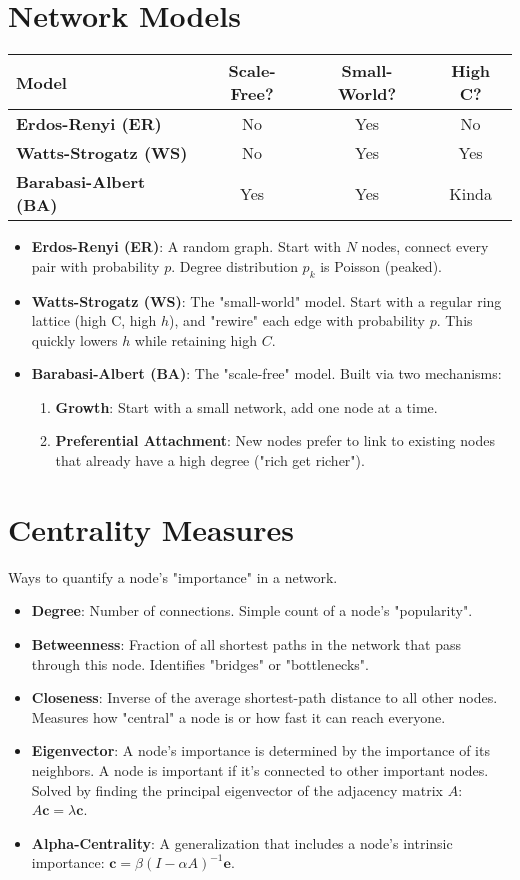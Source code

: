 \documentclass[8pt,a4paper,twocolumn]{article}
\newcommand{\cc}{\mathbf{c}}
\newcommand{\ee}{\mathbf{e}}
\newcommand{\0}{\mathbf{0}}
\begin{document}
\section*{Network Models}
\begin{tabular}{@{}lccc@{}}
\toprule
\textbf{Model} & \textbf{Scale-Free?} & \textbf{Small-World?} & \textbf{High C?} \\
\midrule
\textbf{Erdos-Renyi (ER)} & No & Yes & No \\
\textbf{Watts-Strogatz (WS)} & No & Yes & Yes \\
\textbf{Barabasi-Albert (BA)} & Yes & Yes & Kinda \\
\bottomrule
\end{tabular}
\begin{itemize}
    \item \textbf{Erdos-Renyi (ER)}: A random graph. Start with $N$ nodes, connect every pair with probability $p$. Degree distribution $p_k$ is Poisson (peaked).
    \item \textbf{Watts-Strogatz (WS)}: The "small-world" model. Start with a regular ring lattice (high C, high $h$), and "rewire" each edge with probability $p$. This quickly lowers $h$ while retaining high $C$.
    \item \textbf{Barabasi-Albert (BA)}: The "scale-free" model. Built via two mechanisms:
        \begin{enumerate}
            \item \textbf{Growth}: Start with a small network, add one node at a time.
            \item \textbf{Preferential Attachment}: New nodes prefer to link to existing nodes that already have a high degree ("rich get richer").
        \end{enumerate}
\end{itemize}

\section*{Centrality Measures}
Ways to quantify a node's "importance" in a network.
\begin{itemize}
    \item \textbf{Degree}: Number of connections. Simple count of a node's "popularity".
    \item \textbf{Betweenness}: Fraction of all shortest paths in the network that pass through this node. Identifies "bridges" or "bottlenecks".
    \item \textbf{Closeness}: Inverse of the average shortest-path distance to all other nodes. Measures how "central" a node is or how fast it can reach everyone.
    \item \textbf{Eigenvector}: A node's importance is determined by the importance of its neighbors. A node is important if it's connected to other important nodes. Solved by finding the principal eigenvector of the adjacency matrix $A$: $A\cc = \lambda\cc$.
    \item \textbf{Alpha-Centrality}: A generalization that includes a node's intrinsic importance: $\cc = \beta(I - \alpha A)^{-1}\ee$.
\end{itemize}
\end{document}
